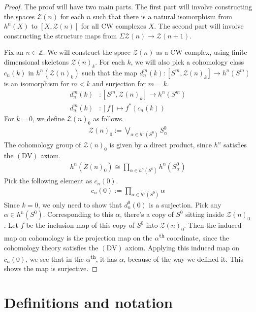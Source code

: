 \documentclass[12pt, notitlepage]{article}
\theoremstyle{definition}
\newcommand{\calz}{\mathcal{Z}}
\begin{document}
\begin{proof}
  The proof will have two main parts. The first part will involve constructing the spaces $\calz(n)$
  for each $n$ such that there is a natural isomorphism from $h^n(X)$ to
  $\left[ X, \calz(n) \right]$ for all CW complexes $X$. The second part will involve constructing
  the structure maps from $\Sigma \calz(n) \to \calz(n+1)$.

  Fix an $n \in \mathbb{Z}$. We will construct the space $\calz(n)$ as a CW complex, using finite
  dimensional skeletons $\calz(n)_k$. For each $k$, we will also pick a cohomology class $c_n(k)$ in
  $h^n(\calz(n)_k)$ such that the map $d_n^{m}(k): \left[S^m, \calz(n)_k \right] \to h^n(S^m)$ is an
  isomorphism for $m < k$ and surjection for $m=k$.
  \begin{align*}
    d_n^{m}(k) &: \left[ S^m, \calz(n)_k\right] \to h^n(S^m) \\
    d_n^{m}(k) &: [f] \mapsto f^{\ast}(c_n(k))
  \end{align*}
  For $k=0$, we define $\calz(n)_0$ as follows.
  \begin{align*}
    \calz(n)_0 := \bigvee_{\alpha \in h^n(S^0)} S_{\alpha}^0
  \end{align*}
  The cohomology group of $\calz(n)_0$ is given by a direct product, since $h^n$ satisfies the
  $\mathrm{(DV)}$ axiom.
  \begin{align*}
    h^n(Z(n)_0) \cong \prod_{\alpha \in h^n(S^0)} h^n(S_{\alpha}^0)
  \end{align*}
  Pick the following element as $c_n(0)$.
  \begin{align*}
    c_n(0) := \prod_{\alpha \in h^n(S^0)} \alpha
  \end{align*}
  Since $k=0$, we only need to show that $d_n^0(0)$ is a surjection. Pick any $\alpha \in h^n(S^0)$.
  Corresponding to this $\alpha$, there's a copy of $S^0$ sitting inside $\calz(n)_0$. Let $f$ be
  the inclusion map of this copy of $S^0$ into $\calz(n)_0$. Then the induced map on cohomology is
  the projection map on the $\alpha$\textsuperscript{th} coordinate, since the cohomology theory
  satisfies the $(\mathrm{DV})$ axiom. Applying this induced map on $c_n(0)$, we see that in the
  $\alpha$\textsuperscript{th}, it has $\alpha$, because of the way we defined it.  This shows the
  map is surjective.
\end{proof}

\newpage

\appendix

\section{Definitions and notation}
\label{sec:definitions-notation}
\end{document}
